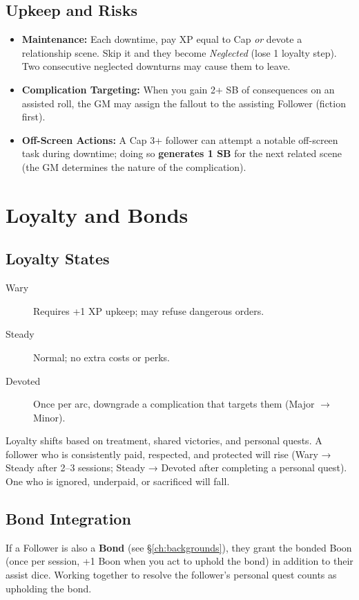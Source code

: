 \subsection*{Upkeep and Risks}
\begin{itemize}
  \item \textbf{Maintenance:} Each downtime, pay XP equal to Cap \emph{or} devote a relationship scene. Skip it and they become \emph{Neglected} (lose 1 loyalty step). Two consecutive neglected downturns may cause them to leave.
  \item \textbf{Complication Targeting:} When you gain 2+ SB of consequences on an assisted roll, the GM may assign the fallout to the assisting Follower (fiction first).
  \item \textbf{Off-Screen Actions:} A Cap 3+ follower can attempt a notable off-screen task during downtime; doing so \textbf{generates 1 SB} for the next related scene (the GM determines the nature of the complication).
\end{itemize}

\section{Loyalty and Bonds}

\subsection*{Loyalty States}
\begin{description}
  \item[Wary] Requires +1 XP upkeep; may refuse dangerous orders.
  \item[Steady] Normal; no extra costs or perks.
  \item[Devoted] Once per arc, downgrade a complication that targets them (Major \(\rightarrow\) Minor). 
\end{description}
Loyalty shifts based on treatment, shared victories, and personal quests. A follower who is consistently paid, respected, and protected will rise (Wary → Steady after 2–3 sessions; Steady → Devoted after completing a personal quest). One who is ignored, underpaid, or sacrificed will fall.

\subsection*{Bond Integration}
If a Follower is also a \textbf{Bond} (see \S\ref{ch:backgrounds}), they grant the bonded Boon (once per session, +1 Boon when you act to uphold the bond) in addition to their assist dice. Working together to resolve the follower’s personal quest counts as upholding the bond.

